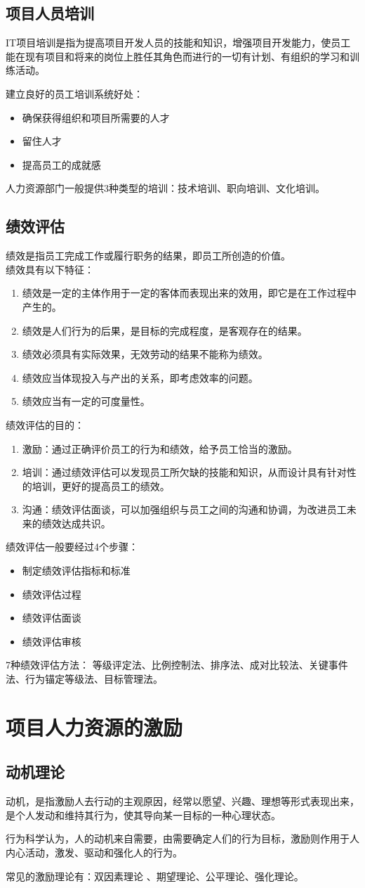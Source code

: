 \subsection{项目人员培训}
IT项目培训是指为提高项目开发人员的技能和知识，增强项目开发能力，使员工能在现有项目和将来的岗位上胜任其角色而进行的一切有计划、有组织的学习和训练活动。
\par 建立良好的员工培训系统好处：
\begin{itemize}
	\item 确保获得组织和项目所需要的人才
	\item 留住人才
	\item 提高员工的成就感
\end{itemize}
人力资源部门一般提供3种类型的培训：技术培训、职向培训、文化培训。
\subsection{绩效评估}
绩效是指员工完成工作或履行职务的结果，即员工所创造的价值。
\\绩效具有以下特征：
\begin{enumerate}
	\item 绩效是一定的主体作用于一定的客体而表现出来的效用，即它是在工作过程中产生的。
	\item 绩效是人们行为的后果，是目标的完成程度，是客观存在的结果。
	\item 绩效必须具有实际效果，无效劳动的结果不能称为绩效。
	\item 绩效应当体现投入与产出的关系，即考虑效率的问题。
	\item 绩效应当有一定的可度量性。
\end{enumerate}
绩效评估的目的：
\begin{enumerate}
	\item 激励：通过正确评价员工的行为和绩效，给予员工恰当的激励。
	\item 培训：通过绩效评估可以发现员工所欠缺的技能和知识，从而设计具有针对性的培训，更好的提高员工的绩效。
	\item 沟通：绩效评估面谈，可以加强组织与员工之间的沟通和协调，为改进员工未来的绩效达成共识。
\end{enumerate}
绩效评估一般要经过4个步骤：
\begin{itemize}
	\item 制定绩效评估指标和标准
	\item 绩效评估过程
	\item 绩效评估面谈
	\item 绩效评估审核
\end{itemize}
7种绩效评估方法：
等级评定法、比例控制法、排序法、成对比较法、关键事件法、行为锚定等级法、目标管理法。
\section{项目人力资源的激励}
\subsection{动机理论}
动机，是指激励人去行动的主观原因，经常以愿望、兴趣、理想等形式表现出来，是个人发动和维持其行为，使其导向某一目标的一种心理状态。
\par 行为科学认为，人的动机来自需要，由需要确定人们的行为目标，激励则作用于人内心活动，激发、驱动和强化人的行为。
\par 常见的激励理论有：双因素理论 、期望理论、公平理论、强化理论。
